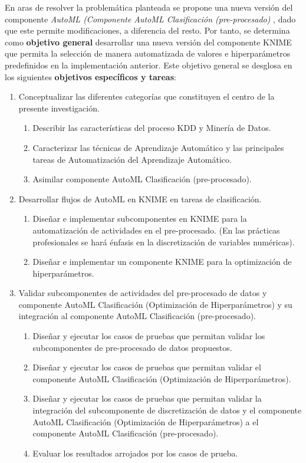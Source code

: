 En aras de resolver la problemática planteada se propone una nueva versión del componente \textit{AutoML (Componente AutoML Clasificación (pre-procesado)} \citep{Carrazana2022}, dado que este permite modificaciones, a diferencia del resto. Por tanto, se determina como \textbf{objetivo general} desarrollar una nueva versión del componente KNIME que permita la selección de manera automatizada de valores e hiperparámetros predefinidos en la implementación anterior. Este objetivo general se desglosa en los siguientes \textbf{objetivos específicos y tareas}:

\begin{enumerate}
	\item Conceptualizar las diferentes categorías que constituyen el centro de la presente investigación.
	\begin{enumerate}
		\item Describir las características del proceso KDD y Minería de Datos. 
		\item Caracterizar las técnicas de Aprendizaje Automático y las principales tareas de Automatización del Aprendizaje Automático.
		\item Asimilar componente AutoML Clasificación (pre-procesado).
	\end{enumerate}
	\item Desarrollar flujos de AutoML en KNIME en tareas de clasificación.
	\begin{enumerate}
		\item Diseñar e implementar subcomponentes en KNIME para la automatización de actividades en el pre-procesado. (En las prácticas profesionales se hará énfasis en la discretización de variables numéricas).
		\item Diseñar e implementar un componente KNIME para la optimización de hiperparámetros.
	\end{enumerate}
	\item Validar subcomponentes de actividades del pre-procesado de datos y componente AutoML Clasificación (Optimización de Hiperparámetros) y su integración al componente AutoML Clasificación (pre-procesado).
	\begin{enumerate}
		\item Diseñar y ejecutar los casos de pruebas que permitan validar los subcomponentes de pre-procesado de datos propuestos. 
		\item Diseñar y ejecutar los casos de pruebas que permitan validar el componente AutoML Clasificación (Optimización de Hiperparámetros).
		\item Diseñar y ejecutar los casos de pruebas que permitan validar la integración del subcomponente de discretización de datos y el componente AutoML Clasificación (Optimización de Hiperparámetros) a el componente AutoML Clasificación (pre-procesado).
		\item Evaluar los resultados arrojados por los casos de prueba.
	\end{enumerate} 
\end{enumerate}


